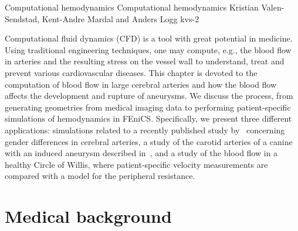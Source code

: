 \begingroup

\setcounter{chapter}{22}
\setcounter{chpnum}{22}

              {Computational hemodynamics}
              {Computational hemodynamics}
              {Kristian Valen-Sendstad, Kent-Andre Mardal and Anders Logg}
              {kvs-2}


Computational fluid dynamics (CFD) is a tool with great potential in
medicine. Using traditional engineering techniques, one may compute,
e.g., the blood flow in arteries and the resulting stress on the
vessel wall to understand, treat and prevent various cardiovascular
diseases. This chapter is devoted to the computation of blood flow in
large cerebral arteries and how the blood flow affects the development
and rupture of aneurysms. We discuss the process, from generating
geometries from medical imaging data to performing patient-specific
simulations of hemodynamics in FEniCS. Specifically, we present three
different applications: simulations related to a recently published
study by~\citet{LindekleivValen-SendstadMorganEtAl2010} concerning
gender differences in cerebral arteries, a study of the carotid
arteries of a canine with an induced aneurysm described
in~\citet{JiangJohnsonValen-SendstadEtAl2010}, and a study of the
blood flow in a healthy Circle of Willis, where patient-specific
velocity measurements are compared with a model for the peripheral
resistance.

\section{Medical background} \label{Medical_Background}

